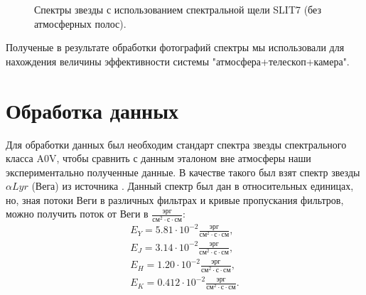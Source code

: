 \documentclass[a4paper]{article}
\begin{document}
\begin{figure}[h]
\begin{minipage}[h]{0.50\linewidth}
\end{minipage}
\begin{minipage}[h]{0.50\linewidth}
\end{minipage}
\caption{Спектры звезды с использованием спектральной щели SLIT7 (без атмосферных полос).}
\label{ris:image3}
\end{figure}

\hfill\break
Полученые в результате обработки фотографий спектры мы использовали для нахождения величины эффективности системы "атмосфера+телескоп+камера".
\section{Обработка данных}
Для обработки данных был необходим стандарт спектра звезды спектрального класса A0V, чтобы сравнить с данным эталоном вне атмосферы наши экспериментально полученные данные. В качестве такого был взят спектр звезды $\alpha Lyr$ (Вега) из источника \cite{Vega}. Данный спектр был дан в относительных единицах, но, зная потоки Веги в различных фильтрах и кривые пропускания фильтров, можно получить поток от Веги в $\frac{\text{эрг}}{\text{см}^2\cdot\text{с}\cdot\text{см}}$:
\begin{eqnarray*}
E_{Y} =  5.81\cdot10^{-2} \frac{\text{эрг}}{\text{см}^2\cdot\text{с}\cdot\text{см}},\\
E_{J} =  3.14\cdot10^{-2} \frac{\text{эрг}}{\text{см}^2\cdot\text{с}\cdot\text{см}},\\
E_{H} =  1.20\cdot10^{-2} \frac{\text{эрг}}{\text{см}^2\cdot\text{с}\cdot\text{см}},\\
E_{K} =  0.412\cdot10^{-2} \frac{\text{эрг}}{\text{см}^2\cdot\text{с}\cdot\text{см}}.\\
\end{eqnarray*}
\end{document}
